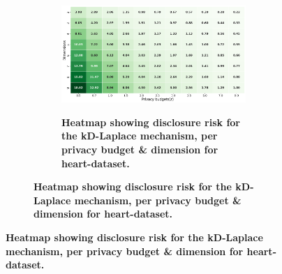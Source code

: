 \newpage
\begin{figure}[H]
    \centering
    \begin{subfigure}[b]{0.85\textwidth}
        \begin{subfigure}[c]{1\textwidth}
            \caption{\textbf{Heatmap showing disclosure risk for the kD-Laplace mechanism, per privacy budget \& dimension for heart-dataset.}}
            \includegraphics[width=1\textwidth]{Results/kd-laplace/kd-Laplace/heart-dataset/distance.png}
            \label{fig:privacy_risk_heart-dataset_adversial_advantage_kd-laplace}
        \end{subfigure}
        \vfill %


\end{subfigure}
\end{figure}
